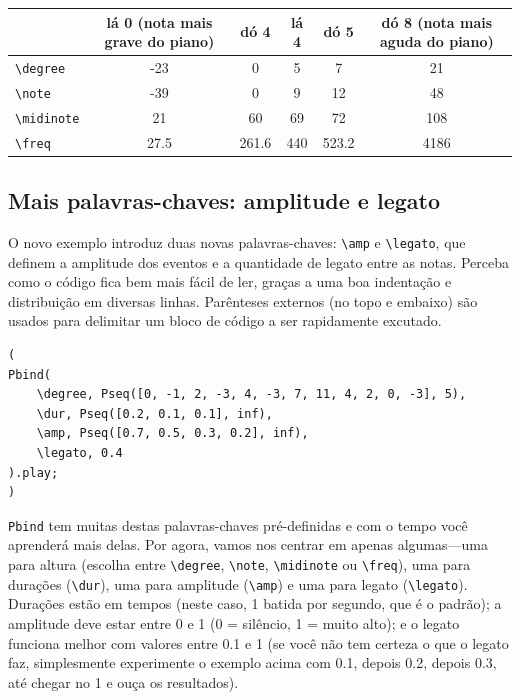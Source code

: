 \bigskip
{}
\bigskip


\begin{tabular}{|l|c|c|c|c|c|}
\hline 
  & \textbf{lá 0 (nota mais grave do piano)} & \textbf{dó 4} & \textbf{lá 4} & \textbf{dó 5} & \textbf{dó 8 (nota mais aguda do piano)} \\ 
\hline 
\texttt{\textbackslash degree} & -23 & 0 & 5 & 7 & 21 \\
\hline
\texttt{\textbackslash note} & -39 & 0 & 9 & 12 & 48 \\
\hline
\texttt{\textbackslash midinote} & 21 & 60 & 69 & 72 & 108 \\
\hline
\texttt{\textbackslash freq} & 27.5 & 261.6 & 440 & 523.2 & 4186 \\
\hline
\end{tabular}
\bigskip


\subsection{Mais palavras-chaves: amplitude e legato}

O novo exemplo introduz duas novas palavras-chaves: \texttt{\textbackslash amp} e \texttt{\textbackslash legato}, que definem a amplitude dos eventos e a quantidade de legato entre as notas. Perceba como o código fica bem mais fácil de ler, graças a uma boa indentação e distribuição em diversas linhas. Parênteses externos (no topo e embaixo) são usados para delimitar um bloco de código a ser rapidamente excutado.

 
\begin{lstlisting}[style=SuperCollider-IDE, basicstyle=\scttfamily\footnotesize]
(
Pbind(
	\degree, Pseq([0, -1, 2, -3, 4, -3, 7, 11, 4, 2, 0, -3], 5),
	\dur, Pseq([0.2, 0.1, 0.1], inf),
	\amp, Pseq([0.7, 0.5, 0.3, 0.2], inf),
	\legato, 0.4
).play;
)
\end{lstlisting}
 

\texttt{Pbind} tem muitas destas palavras-chaves pré-definidas e com o tempo você aprenderá mais delas. Por agora, vamos nos centrar em apenas algumas---uma para altura (escolha entre \texttt{\textbackslash degree}, \texttt{\textbackslash note}, \texttt{\textbackslash midinote} ou \texttt{\textbackslash freq}), uma para durações (\texttt{\textbackslash dur}), uma para amplitude (\texttt{\textbackslash amp}) e uma para legato (\texttt{\textbackslash legato}). Durações estão em tempos (neste caso, 1 batida por segundo, que é o padrão); a amplitude deve estar entre 0 e 1 (0 = silêncio, 1 = muito alto); e o legato funciona melhor com valores entre 0.1 e 1 (se você não tem certeza o que o legato faz, simplesmente experimente o exemplo acima com 0.1, depois 0.2, depois 0.3, até chegar no 1 e ouça os resultados).

